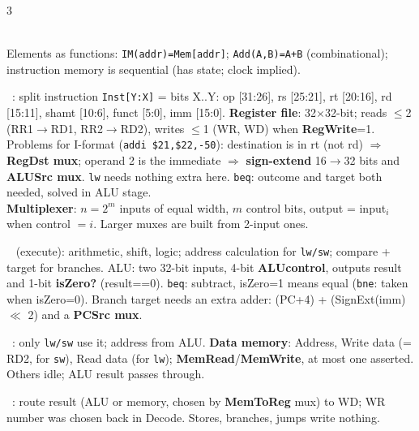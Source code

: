 \documentclass[landscape]{article}
\newcommand{\sub}[1]{\par\vspace{1pt}{\color{cur}\bfseries #1}\ }
\newcommand{\key}[1]{\textbf{\color{BrickRed}#1}}
\newcommand{\tc}[1]{\texttt{#1}}
\newlength{\fu}\setlength{\fu}{5.4pt}
\begin{document}
\begin{multicols}{3}
\\
Elements as functions: \tc{IM(addr)=Mem[addr]}; \tc{Add(A,B)=A+B} (combinational); instruction memory is sequential (has state; clock implied).\\
\sub{2 Decode}: split instruction \tc{Inst[Y:X]} = bits X..Y: op [31:26], rs [25:21], rt [20:16], rd [15:11], shamt [10:6], funct [5:0], imm [15:0]. \key{Register file}: 32$\times$32-bit; reads $\le$2 (RR1$\to$RD1, RR2$\to$RD2), writes $\le$1 (WR, WD) when \key{RegWrite}=1.\\
Problems for I-format (\tc{addi \$21,\$22,-50}): destination is in rt (not rd) $\Rightarrow$ \key{RegDst mux}; operand 2 is the immediate $\Rightarrow$ \key{sign-extend} 16$\to$32 bits and \key{ALUSrc mux}. \tc{lw} needs nothing extra here. \tc{beq}: outcome and target both needed, solved in ALU stage.\\
\key{Multiplexer}: $n=2^m$ inputs of equal width, $m$ control bits, output = input$_i$ when control $=i$. Larger muxes are built from 2-input ones.\\
\sub{3 ALU} (execute): arithmetic, shift, logic; address calculation for \tc{lw/sw}; compare + target for branches. ALU: two 32-bit inputs, 4-bit \key{ALUcontrol}, outputs result and 1-bit \key{isZero?} (result==0). \tc{beq}: subtract, isZero=1 means equal (\tc{bne}: taken when isZero=0). Branch target needs an extra adder: (PC+4) + (SignExt(imm) $\ll$ 2) and a \key{PCSrc mux}.\\
\sub{4 Memory}: only \tc{lw/sw} use it; address from ALU. \key{Data memory}: Address, Write data (= RD2, for \tc{sw}), Read data (for \tc{lw}); \key{MemRead}/\key{MemWrite}, at most one asserted. Others idle; ALU result passes through.\\
\sub{5 RegWrite}: route result (ALU or memory, chosen by \key{MemToReg} mux) to WD; WR number was chosen back in Decode. Stores, branches, jumps write nothing.


\end{multicols}
\end{document}
